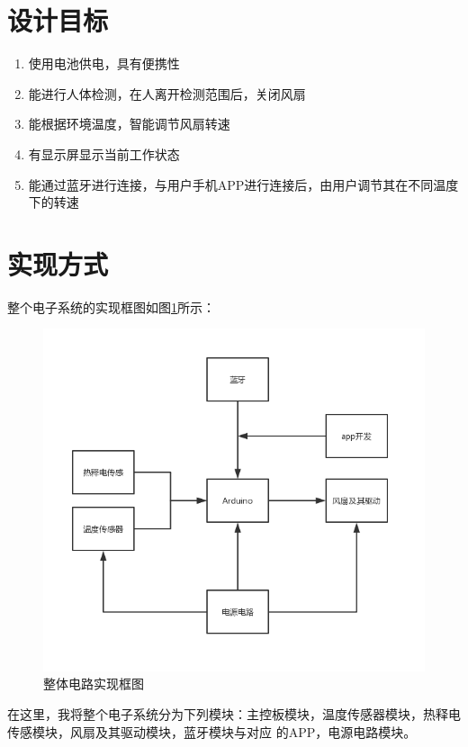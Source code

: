 \documentclass{article}
\begin{document}
\begin{spacing}{1.5}
\section{设计目标}

\begin{enumerate}
    \item 使用电池供电，具有便携性
    \item 能进行人体检测，在人离开检测范围后，关闭风扇
    \item 能根据环境温度，智能调节风扇转速
    \item 有显示屏显示当前工作状态
    \item 能通过蓝牙进行连接，与用户手机APP进行连接后，由用户调节其在不同温度下的转速
\end{enumerate}

\section{实现方式}

整个电子系统的实现框图如图\ref{fig:design_total}所示：

\begin{figure}[H]
    \centering
    \includegraphics[scale=0.4]{fig/design/total.png}
    \caption{整体电路实现框图}
    \label{fig:design_total}
\end{figure}

在这里，我将整个电子系统分为下列模块：主控板模块，温度传感器模块，热释电传感模块，风扇及其驱动模块，蓝牙模块与对应
的APP，电源电路模块。


\end{spacing}
\end{document}
